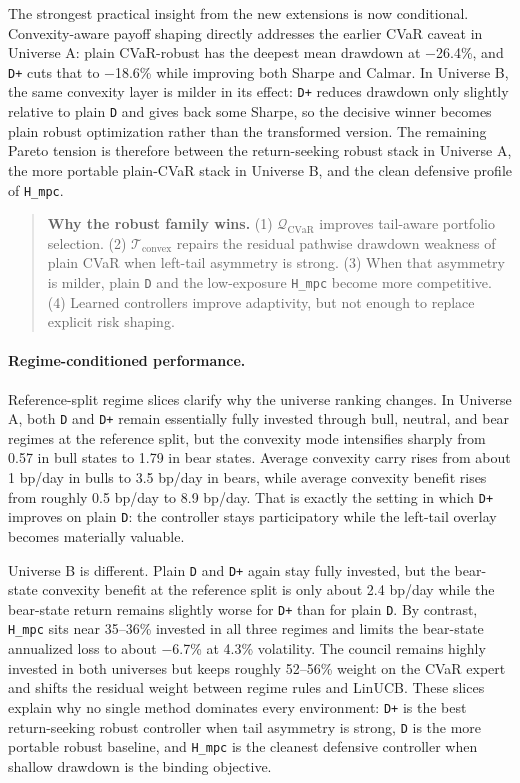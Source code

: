 \documentclass[10pt,twocolumn]{article}
\begin{document}
The strongest practical insight from the new extensions is now conditional.
Convexity-aware payoff shaping directly addresses the earlier CVaR caveat in
Universe A: plain CVaR-robust has the deepest mean drawdown at $-$26.4\%, and
\texttt{D+} cuts that to $-$18.6\% while improving both Sharpe and Calmar. In
Universe B, the same convexity layer is milder in its effect: \texttt{D+}
reduces drawdown only slightly relative to plain \texttt{D} and gives back some
Sharpe, so the decisive winner becomes plain robust optimization rather than
the transformed version. The remaining Pareto tension is therefore between the
return-seeking robust stack in Universe A, the more portable plain-CVaR stack
in Universe B, and the clean defensive profile of \texttt{H\_mpc}.

\begin{quote}\small\noindent\textbf{Why the robust family wins.} (1) $\mathcal{Q}_{\text{CVaR}}$ improves tail-aware portfolio selection. (2) $\mathcal{T}_{\text{convex}}$ repairs the residual pathwise drawdown weakness of plain CVaR when left-tail asymmetry is strong. (3) When that asymmetry is milder, plain \texttt{D} and the low-exposure \texttt{H\_mpc} become more competitive. (4) Learned controllers improve adaptivity, but not enough to replace explicit risk shaping.\end{quote}

\paragraph{Regime-conditioned performance.}
Reference-split regime slices clarify why the universe ranking changes. In
Universe A, both \texttt{D} and \texttt{D+} remain essentially fully invested
through bull, neutral, and bear regimes at the reference split, but the
convexity mode intensifies sharply from 0.57 in bull states to 1.79 in bear
states. Average convexity carry rises from about 1 bp/day in bulls to 3.5
bp/day in bears, while average convexity benefit rises from roughly 0.5 bp/day
to 8.9 bp/day. That is exactly the setting in which \texttt{D+} improves on
plain \texttt{D}: the controller stays participatory while the left-tail
overlay becomes materially valuable.

Universe B is different. Plain \texttt{D} and \texttt{D+} again stay fully
invested, but the bear-state convexity benefit at the reference split is only
about 2.4 bp/day while the bear-state return remains slightly worse for
\texttt{D+} than for plain \texttt{D}. By contrast, \texttt{H\_mpc} sits near
35--36\% invested in all three regimes and limits the bear-state annualized
loss to about $-$6.7\% at 4.3\% volatility. The council remains highly invested
in both universes but keeps roughly 52--56\% weight on the CVaR expert and
shifts the residual weight between regime rules and LinUCB. These slices
explain why no single method dominates every environment: \texttt{D+} is the
best return-seeking robust controller when tail asymmetry is strong,
\texttt{D} is the more portable robust baseline, and \texttt{H\_mpc} is the
cleanest defensive controller when shallow drawdown is the binding objective.
\end{document}
